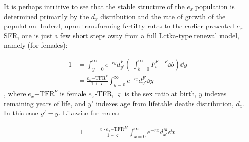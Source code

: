 It is perhaps intuitive to see that the stable structure of the $e_x$ population
is determined primarily by the $d_x$ distribution and the rate of growth of the
population. Indeed, upon transforming fertility rates to the earlier-presented
$e_x$-SFR, one is just a few short steps away from a full Lotka-type renewal
model, namely (for females):

\begin{align}
1 &= \int _{y = 0}^\infty e^{-ry} d_{y'}^F \left(\;\int _{b = 0}^\infty
F_b^{F-F} \dd b\right)  \dd y \\
&= \frac{e_x\mathrm{-TFR}^F}{1 + \varsigma} \int _{y = 0}^\infty e^{-ry}
d_{y'}^F \dd y
\end{align}
, where $e_x\mathrm{-TFR}^F$ is female $e_x$-TFR, $\varsigma$ is the sex
ratio at birth, $y$ indexes remaining years of life, and $y'$ indexes age from
lifetable deaths distribution, $d_x$. In this case $y' = y$. Likewise for males:

\begin{align}
1 &= \frac{\varsigma \cdot e_x\mathrm{-TFR}^M}{1 + \varsigma} \int _{x =
0}^\infty e^{-rx} d_{x'}^M \dd x
\end{align}






